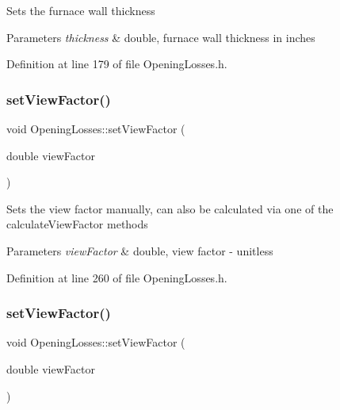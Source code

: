 Sets the furnace wall thickness 
\begin{DoxyParams}{Parameters}
{\em thickness} & double, furnace wall thickness in inches \\
\hline
\end{DoxyParams}


Definition at line 179 of file Opening\+Losses.\+h.

\mbox{\label{class_opening_losses_a4e6c6f1549e01cd4b82b7505e403d643}} 
\subsubsection{\texorpdfstring{set\+View\+Factor()}{setViewFactor()}\hspace{0.1cm}{\footnotesize\ttfamily [1/3]}}
{\footnotesize\ttfamily void Opening\+Losses\+::set\+View\+Factor (\begin{DoxyParamCaption}\item[{double}]{view\+Factor }\end{DoxyParamCaption})\hspace{0.3cm}{\ttfamily [inline]}}

Sets the view factor manually, can also be calculated via one of the calculate\+View\+Factor methods 
\begin{DoxyParams}{Parameters}
{\em view\+Factor} & double, view factor -\/ unitless \\
\hline
\end{DoxyParams}


Definition at line 260 of file Opening\+Losses.\+h.

\mbox{\label{class_opening_losses_a4e6c6f1549e01cd4b82b7505e403d643}} 
\subsubsection{\texorpdfstring{set\+View\+Factor()}{setViewFactor()}\hspace{0.1cm}{\footnotesize\ttfamily [2/3]}}
{\footnotesize\ttfamily void Opening\+Losses\+::set\+View\+Factor (\begin{DoxyParamCaption}\item[{double}]{view\+Factor }\end{DoxyParamCaption})\hspace{0.3cm}{\ttfamily [inline]}}


